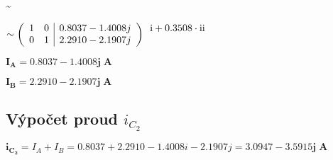 \documentclass[a4paper,12pt]{article}
\newcommand{\RN}[1]{%
  \textup{\uppercase\expandafter{\romannumeral#1}}%
}
\begin{document}
\sim\)\par
\(\sim\left(
	\begin{array}{cc|c}
	1 & 0 & 0.8037-1.4008j \\
    0 & 1 & 2.2910-2.1907j \\
	\end{array}
\right)
	\begin {array}{c}
	\RN{1}+0.3508\cdot\RN{2} \\
	\\
	\end{array}\)\par\vspace{1em}
	$\mathbf{I_A}=\mathbf{0.8037-1.4008j\;\si{\ampere}}$\par
	$\mathbf{I_B}=\mathbf{2.2910-2.1907j\;\si{\ampere}}$\par
\subsection{Výpočet proud $i_{C_2}$}\par
$\mathbf{i_{C_2}}=I_A+I_B=0.8037+2.2910-1.4008i-2.1907j=\mathbf{3.0947-3.5915j\;\si{\ampere}}$\par
\end{document}
